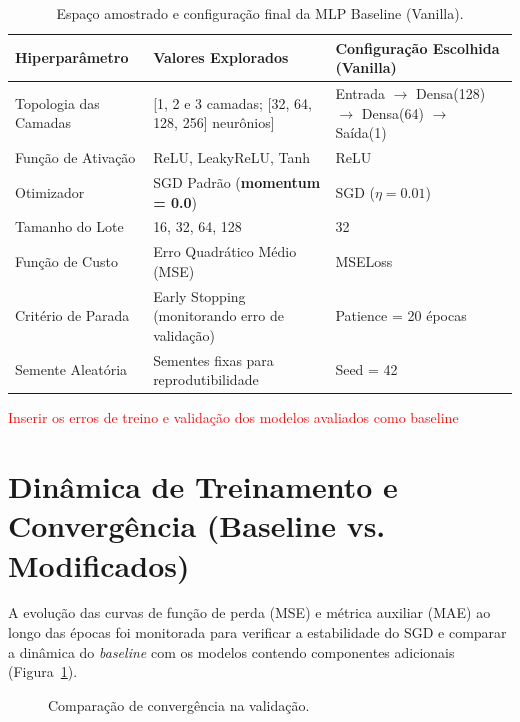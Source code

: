 \documentclass[11pt,a4paper]{article}
\begin{document}
\begin{table}[h]
\centering
\small
\caption{Espaço amostrado e configuração final da MLP Baseline (Vanilla).}
\label{tab:baseline_hiper}
\begin{tabularx}{\textwidth}{lXl}
\toprule
\textbf{Hiperparâmetro} & \textbf{Valores Explorados} & \textbf{Configuração Escolhida (Vanilla)} \\
\midrule
Topologia das Camadas & [1, 2 e 3 camadas; [32, 64, 128, 256] neurônios] & Entrada $\rightarrow$ Densa(128) $\rightarrow$ Densa(64) $\rightarrow$ Saída(1) \\
Função de Ativação    & ReLU, LeakyReLU, Tanh & ReLU \\
Otimizador            & SGD Padrão (\textbf{momentum = 0.0}) & SGD ($\eta = 0.01$) \\
Tamanho do Lote       & 16, 32, 64, 128 & 32 \\
Função de Custo       & Erro Quadrático Médio (MSE) & MSELoss \\
Critério de Parada    & Early Stopping (monitorando erro de validação) & Patience = 20 épocas \\
Semente Aleatória     & Sementes fixas para reprodutibilidade & Seed = 42 \\
\bottomrule
\end{tabularx}
\end{table}

\textcolor{red}{Inserir os erros de treino e validação dos modelos avaliados como baseline}

\section{Dinâmica de Treinamento e Convergência (Baseline vs. Modificados)}

A evolução das curvas de função de perda (MSE) e métrica auxiliar (MAE) ao longo das épocas foi monitorada para verificar a estabilidade do SGD e comparar a dinâmica do \textit{baseline} com os modelos contendo componentes adicionais (Figura~\ref{fig:loss_evolution}).

\begin{figure}[h]
\centering
\begin{minipage}{0.48\textwidth}
    \centering
    \caption{Convergência da MLP Baseline.}
    \label{fig:loss_baseline}
\end{minipage}
\hfill
\begin{minipage}{0.48\textwidth}
    \centering
    \caption{Comparação de convergência na validação.}
    \label{fig:loss_ablation}
\end{minipage}
\label{fig:loss_evolution}
\end{figure}
\end{document}
